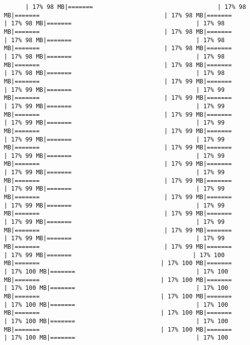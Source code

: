 \documentclass[
]{article}
\begin{document}
\begin{verbatim}
      | 17% 98 MB|=======                                   | 17% 98 MB|=======                                   | 17% 98 MB|=======                                   | 17% 98 MB|=======                                   | 17% 98 MB|=======                                   | 17% 98 MB|=======                                   | 17% 98 MB|=======                                   | 17% 98 MB|=======                                   | 17% 98 MB|=======                                   | 17% 98 MB|=======                                   | 17% 98 MB|=======                                   | 17% 98 MB|=======                                   | 17% 98 MB|=======                                   | 17% 98 MB|=======                                   | 17% 99 MB|=======                                   | 17% 99 MB|=======                                   | 17% 99 MB|=======                                   | 17% 99 MB|=======                                   | 17% 99 MB|=======                                   | 17% 99 MB|=======                                   | 17% 99 MB|=======                                   | 17% 99 MB|=======                                   | 17% 99 MB|=======                                   | 17% 99 MB|=======                                   | 17% 99 MB|=======                                   | 17% 99 MB|=======                                   | 17% 99 MB|=======                                   | 17% 99 MB|=======                                   | 17% 99 MB|=======                                   | 17% 99 MB|=======                                   | 17% 99 MB|=======                                   | 17% 99 MB|=======                                   | 17% 99 MB|=======                                   | 17% 99 MB|=======                                   | 17% 99 MB|=======                                   | 17% 99 MB|=======                                   | 17% 99 MB|=======                                   | 17% 99 MB|=======                                   | 17% 99 MB|=======                                   | 17% 99 MB|=======                                   | 17% 99 MB|=======                                   | 17% 99 MB|=======                                   | 17% 99 MB|=======                                   | 17% 99 MB|=======                                   | 17% 99 MB|=======                                   | 17% 99 MB|=======                                  | 17% 100 MB|=======                                  | 17% 100 MB|=======                                  | 17% 100 MB|=======                                  | 17% 100 MB|=======                                  | 17% 100 MB|=======                                  | 17% 100 MB|=======                                  | 17% 100 MB|=======                                  | 17% 100 MB|=======                                  | 17% 100 MB|=======                                  | 17% 100 MB|=======                                  | 17% 100 MB|=======                                  | 17% 100 MB|=======                                  | 17% 100 MB|=======                                  | 17% 100 MB|=======                                  | 17% 100 MB|=======                                  | 17% 100 
\end{verbatim}
\end{document}
